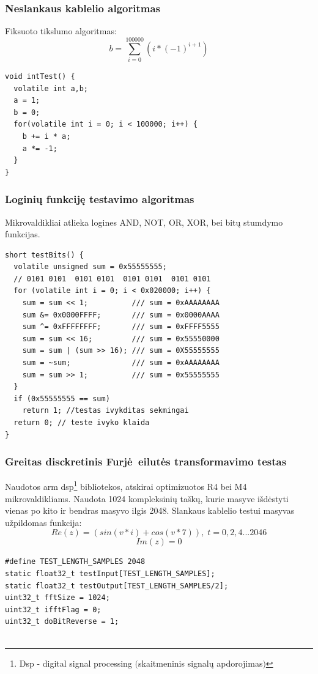 \documentclass[a4paper, 12pt]{article} %
\begin{document}
\begin{onehalfspacing}
\subsubsection{Neslankaus kablelio algoritmas}
Fiksuoto tikslumo algoritmas:
\begin{equation}
b = \sum_{i=0}^{100000} (i * (-1)^{i+1})
\end{equation}

\begin{verbatim}
void intTest() {
  volatile int a,b;
  a = 1;
  b = 0;
  for(volatile int i = 0; i < 100000; i++) {
    b += i * a;
    a *= -1;
  }
}
\end{verbatim}
\subsubsection{Logini\k{u} funkcij\k{e} testavimo algoritmas}
Mikrovaldikliai atlieka logines AND, NOT, OR, XOR, bei bit\k{u} stumdymo funkcijas. 
\begin{verbatim}
short testBits() {
  volatile unsigned sum = 0x55555555; 
  // 0101 0101  0101 0101  0101 0101  0101 0101  
  for (volatile int i = 0; i < 0x020000; i++) {
    sum = sum << 1;          /// sum = 0xAAAAAAAA 
    sum &= 0x0000FFFF;       /// sum = 0x0000AAAA
    sum ^= 0xFFFFFFFF;       /// sum = 0xFFFF5555
    sum = sum << 16;         /// sum = 0x55550000
    sum = sum | (sum >> 16); /// sum = 0X55555555
    sum = ~sum;              /// sum = 0xAAAAAAAA
    sum = sum >> 1;          /// sum = 0x55555555
  }
  if (0x55555555 == sum)
    return 1; //testas ivykditas sekmingai
  return 0; // teste ivyko klaida
}
\end{verbatim}
\subsubsection{Greitas disckretinis Furj\.e\ eilut\.es transformavimo testas}
Naudotos arm dsp\footnote{Dsp - digital signal processing $($skaitmeninis signal\k{u} apdorojimas$)$} bibliotekos, atskirai optimizuotos R4 bei M4 mikrovaldikliams. Naudota 1024 kompleksini\k{u} ta\v{s}k\k{u}, kurie masyve i\v{s}d\.estyti vienas po kito ir bendras masyvo ilgis 2048. Slankaus kablelio testui masyvas u\v{z}pildomas funkcija:
\begin{equation*}
Re(z) = (sin(v*i) + cos(v*7)),\; t = 0, 2, 4... 2046
\end{equation*}
\begin{equation}
Im(z) = 0
\end{equation}
\begin{verbatim}
#define TEST_LENGTH_SAMPLES 2048 
static float32_t testInput[TEST_LENGTH_SAMPLES]; 
static float32_t testOutput[TEST_LENGTH_SAMPLES/2]; 
uint32_t fftSize = 1024; 
uint32_t ifftFlag = 0; 
uint32_t doBitReverse = 1; 


\end{verbatim}
\end{onehalfspacing}
\end{document}
